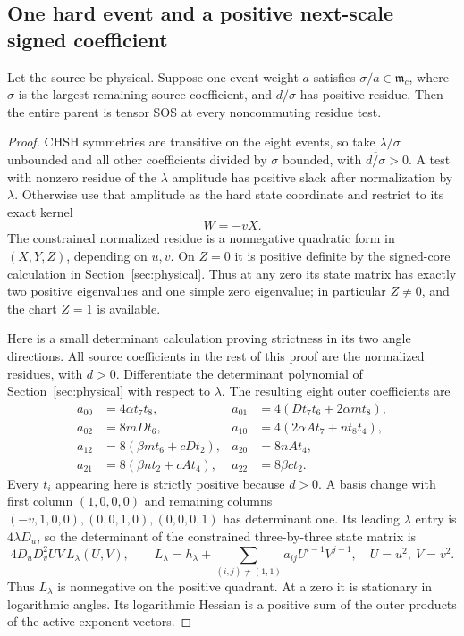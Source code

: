 \subsection{One hard event and a positive next-scale signed coefficient}
\begin{proposition}\label{prop:one-hard-event}
Let the source be physical. Suppose one event weight $a$ satisfies $\sigma/a\in\mathfrak m_c$, where $\sigma$ is the largest remaining source coefficient, and $d/\sigma$ has positive residue. Then the entire parent is tensor SOS at every noncommuting residue test.
\end{proposition}
\begin{proof}
CHSH symmetries are transitive on the eight events, so take $\lambda/\sigma$ unbounded and all other coefficients divided by $\sigma$ bounded, with $\overline{d/\sigma}>0$. A test with nonzero residue of the $\lambda$ amplitude has positive slack after normalization by $\lambda$. Otherwise use that amplitude as the hard state coordinate and restrict to its exact kernel
\[
W=-vX.
\]
The constrained normalized residue is a nonnegative quadratic form in $(X,Y,Z)$, depending on $u,v$. On $Z=0$ it is positive definite by the signed-core calculation in Section~\ref{sec:physical}. Thus at any zero its state matrix has exactly two positive eigenvalues and one simple zero eigenvalue; in particular $Z\ne0$, and the chart $Z=1$ is available.

Here is a small determinant calculation proving strictness in its two angle directions. All source coefficients in the rest of this proof are the normalized residues, with $d>0$. Differentiate the determinant polynomial of Section~\ref{sec:physical} with respect to $\lambda$. The resulting eight outer coefficients are
\begin{align*}
a_{00}&=4\alpha t_7t_8,&
a_{01}&=4(Dt_7t_6+2\alpha m t_8),\\
a_{02}&=8mDt_6,&
a_{10}&=4(2\alpha A t_7+nt_8t_4),\\
a_{12}&=8(\beta m t_6+cDt_2),&
a_{20}&=8nAt_4,\\
a_{21}&=8(\beta n t_2+cAt_4),&
a_{22}&=8\beta ct_2.
\end{align*}
Every $t_i$ appearing here is strictly positive because $d>0$. A basis change with first column $(1,0,0,0)$ and remaining columns $(-v,1,0,0),(0,0,1,0),(0,0,0,1)$ has determinant one. Its leading $\lambda$ entry is $4\lambda D_u$, so the determinant of the constrained three-by-three state matrix is
\[
4D_uD_v^2UV\,L_\lambda(U,V),\qquad
L_\lambda=h_\lambda+\sum_{(i,j)\ne(1,1)}a_{ij}U^{i-1}V^{j-1},
\quad U=u^2,\ V=v^2.
\]
Thus $L_\lambda$ is nonnegative on the positive quadrant. At a zero it is stationary in logarithmic angles. Its logarithmic Hessian is a positive sum of the outer products of the active exponent vectors.


\end{proof}
